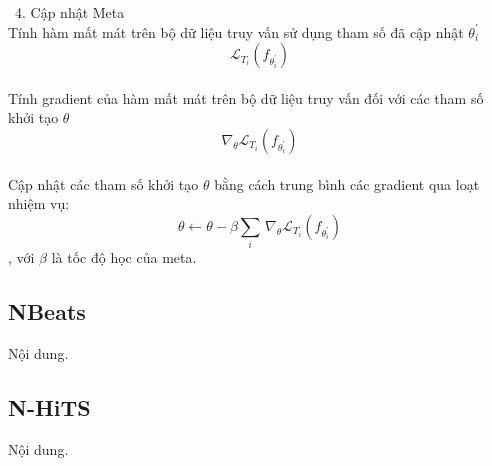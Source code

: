         \indent\textbullet\ 4. Cập nhật Meta\\
            Tính hàm mất mát trên bộ dữ liệu truy vấn sử dụng tham số đã cập nhật \(\theta_i^\prime\) \\ 
            \[\mathcal{L}_{T_i}\left(f_{\theta_i^\prime}\right)\]\\
            Tính gradient của hàm mất mát trên bộ dữ liệu truy vấn đối với các tham số khởi tạo \(\theta\) \\
            \[\nabla_\theta\mathcal{L}_{T_i}\left(f_{\theta_i^\prime}\right)\] \\
            Cập nhật các tham số khởi tạo \(\theta\) bằng cách trung bình các gradient qua loạt nhiệm vụ: \\
            \[\theta \gets \theta - \beta \sum_{i} \, \nabla_{\theta} \mathcal{L}_{T_{i}} \left( f_{\theta_{i}^{\prime}} \right)\]
            , với \(\beta\) là tốc độ học của meta.


\subsection{NBeats}
Nội dung.

\subsection{N-HiTS}
Nội dung.